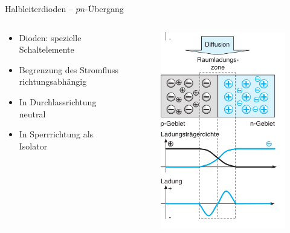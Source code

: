 \documentclass[12pt%
,aspectratio=169%
]{beamer}
\begin{document}
\begin{frame}{Halbleiterdioden -- $pn$-Übergang}
\begin{columns}[T] %
\begin{column}{.48\textwidth}
\vspace*{0.5cm}
\begin{itemize}
	\item Dioden: spezielle Schaltelemente
	\item Begrenzung des Stromﬂuss richtungsabhängig
	\item In Durchlassrichtung neutral
	\item In Sperrrichtung als Isolator
\end{itemize}
\end{column}%
\hfill%
\begin{column}{.48\textwidth}
\begin{figure}
\center
\includegraphics[scale=0.3]{pictures/halbleiterdiode2}
\end{figure}
\end{column}%
\end{columns}
\end{frame}
\end{document}
